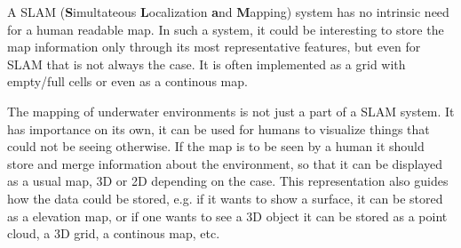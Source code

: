 A SLAM (\textbf{S}imultateous \textbf{L}ocalization \textbf{a}nd
\textbf{M}apping) system has no intrinsic need for a human readable map.
In such a system, it could be interesting to store the map information only
through its most representative features, but even for SLAM that is not always
the case. It is often implemented as a grid with empty/full cells or even as a
continous map.

The mapping of underwater environments is not just a part of a SLAM system. It
has importance on its own, it can be used for humans to visualize things that
could not be seeing otherwise. If the map is to be seen by a human it should
store and merge information about the environment, so that it can be displayed
as a usual map, 3D or 2D depending on the case. This representation also guides
how the data could be stored, e.g. if it wants to show a surface, it can be
stored as a elevation map, or if one wants to see a 3D object it can be stored
as a point cloud, a 3D grid, a continous map, etc.






